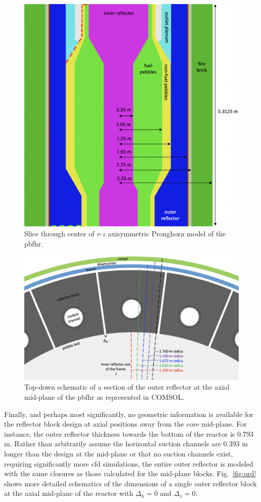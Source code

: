 \begin{figure}[h!]
\centering
\includegraphics[width=0.5\linewidth]{figs/pbfhr_slice.png}
\caption{Slice through center of $r$-$z$ axisymmetric Pronghorn model of the \gls{pbfhr}.}
\label{fig:pbfhr_slice}
\end{figure}

\begin{figure}[h!]
\centering
\includegraphics[width=0.7\linewidth]{figs/pbfhr_or.png}
\caption{Top-down schematic of a section of the outer reflector at the axial mid-plane of the \gls{pbfhr} as represented in COMSOL.}
\label{fig:orh}
\end{figure}

Finally, and perhaps most significantly, no geometric information is available for the reflector block design at axial positions away from the core mid-plane. For instance, the outer reflector thickness towards the bottom of the reactor is 0.793 \si{\meter}. Rather than arbitrarily assume the horizontal suction channels are 0.393 \si{\meter} longer than the design at the mid-plane or that no suction channels exist, requiring significantly more \gls{cfd} simulations, the entire outer reflector is modeled with the same closures as those calculated for the mid-plane blocks. Fig.\ \ref{fig:ord} shows more detailed schematics of the dimensions of a single outer reflector block at the axial mid-plane of the reactor with \(\Delta_h=0\) and \(\Delta_v=0\). 

